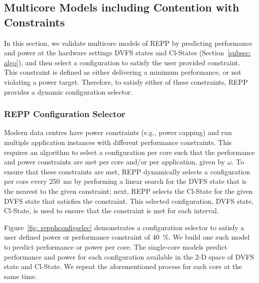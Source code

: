 \subsection{Multicore Models including Contention with Constraints}

\label{subsubsection: multicore evaluation with constraints}

In this section, we validate multicore models of REPP by predicting performance and power
at the hardware settings DVFS states and Cl-States (Section~\ref{subsec: algo}), and then
select a configuration to satisfy the user provided constraint.  This constraint is
defined as either delivering a minimum performance, or not violating a power target.
Therefore, to satisfy either of these constraints, REPP provides a dynamic configuration
selector.


\subsubsection{REPP Configuration Selector}
\label{subsubsec: config selec}


 Modern data centres have power constraints (e.g., power capping) and run
multiple application instances with different performance constraints.  This requires an
algorithm to select a configuration per core such that the performance and power
constraints are met per core and/or per application, given by $\omega$. To ensure that
these constraints are met, REPP dynamically selects a configuration per core every
\SI{250}{\milli\second} by performing a linear search for the DVFS state that is the
nearest to the given constraint; next, REPP selects the Cl-State for the given DVFS
state that satisfies the constraint. This selected configuration, DVFS state, Cl-State, is
used to ensure that the constraint is met for each interval. 

Figure~\ref{fig: repphconfigselec} demonstrates a configuration selector to satisfy a user
defined power or performance constraint of \SI{40}{\percent}. We build one such model to
predict performance or power per core. The single-core models predict performance and
power for each configuration available in the 2-D space of DVFS state and Cl-State. We
repeat the aforementioned process for each core at the same time.


